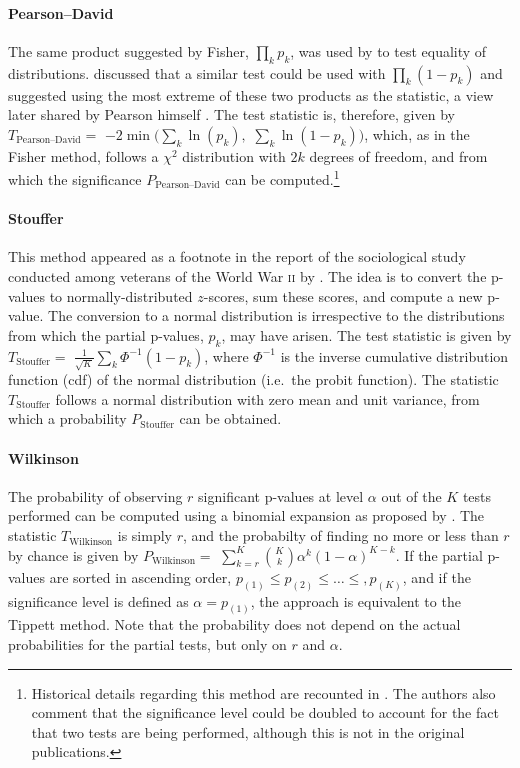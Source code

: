 \paragraph{Pearson--David} The same product suggested by Fisher, $\prod_{k} p_{k}$, was used by \citet{Pearson1933} to test equality of distributions. \citet{David1934} discussed that a similar test could be used with $\prod_{k} (1-p_{k})$ and suggested using the most extreme of these two products as the statistic, a view later shared by Pearson himself \citep{Pearson1934}. The test statistic is, therefore, given by $T_{\text{Pearson--David}}=$ $-2\min\big(\sum_{k} \ln\left(p_{k}\right),$ $\sum_{k} \ln\left(1-p_{k}\right)\big)$, which, as in the Fisher method, follows a $\chi^{2}$ distribution with $2k$ degrees of freedom, and from which the significance $P_{\text{Pearson--David}}$ can be computed.\footnote{Historical details regarding this method are recounted in \citet{Owen2009}. The authors also comment that the significance level could be doubled to account for the fact that two tests are being performed, although this is not in the original publications.}

\paragraph{Stouffer} This method appeared as a footnote in the report of the sociological study conducted among veterans of the World War \textsc{ii} by \citet{Stouffer1949}. The idea is to convert the p-values to normally-distributed $z$-scores, sum these scores, and compute a new p-value. The conversion to a normal distribution is irrespective to the distributions from which the partial p-values, $p_{k}$, may have arisen. The test statistic is given by $T_{\text{Stouffer}} =$ $\frac{1}{\sqrt{K}} \sum_{k} \Phi^{-1}\left(1-p_{k}\right)$, where $\Phi^{-1}$ is the inverse cumulative distribution function (cdf) of the normal distribution (i.e.\ the probit function). The statistic $T_{\text{Stouffer}}$ follows a normal distribution with zero mean and unit variance, from which a probability $P_{\text{Stouffer}}$ can be obtained.

\paragraph{Wilkinson} The probability of observing $r$ significant p-values at level $\alpha$ out of the $K$ tests performed can be computed using a binomial expansion as proposed by \citet{Wilkinson1951}. The statistic $T_{\text{Wilkinson}}$ is simply $r$, and the probabilty of finding no more or less than $r$ by chance is given by $P_{\text{Wilkinson}} =$ $\sum_{k=r}^{K}\binom{K}{k}\alpha^{k}(1-\alpha)^{K-k}$. If the partial p-values are sorted in ascending order, $p_{(1)} \leqslant p_{(2)} \leqslant \ldots \leqslant, p_{(K)}$, and if the significance level is defined as $\alpha=p_{(1)}$, the approach is equivalent to the Tippett method. Note that the probability does not depend on the actual probabilities for the partial tests, but only on $r$ and $\alpha$.


